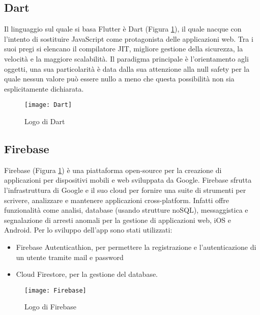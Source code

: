 \subsection{Dart}
Il linguaggio sul quale si basa Flutter è Dart (Figura \ref{fig:dart}), il quale nacque con l’intento di sostituire JavaScript come protagonista delle applicazioni web.\newline
Tra i suoi pregi si elencano il compilatore JIT, migliore gestione della sicurezza, la velocità e la maggiore scalabilità.\newline
Il paradigma principale è l’orientamento agli oggetti, una sua particolarità è data dalla sua attenzione alla null safety per la quale nessun valore può essere nullo a meno che questa possibilità non sia esplicitamente dichiarata.\newline
\begin{figure}[!h] 
    \centering 
    \texttt{[image: Dart]} 
    \caption{Logo di Dart}\label{fig:dart}
\end{figure}

\subsection{Firebase}
Firebase (Figura \ref{fig:dart}) è una piattaforma open-source per la creazione di applicazioni per dispositivi mobili e web sviluppata da Google.\newline
Firebase sfrutta l'infrastruttura di Google e il suo cloud per fornire una suite di strumenti per scrivere, analizzare e mantenere applicazioni cross-platform.\newline
Infatti offre funzionalità come analisi, database (usando strutture noSQL), messaggistica e segnalazione di arresti anomali per la gestione di applicazioni web, iOS e Android.\newline
Per lo sviluppo dell'app sono stati utilizzati:
\begin{itemize}
    \item Firebase Autenticathion, per permettere la registrazione e l'autenticazione di un utente tramite mail e password
    \item Cloud Firestore, per la gestione del database.
\end{itemize}
\begin{figure}[!h] 
    \centering 
    \texttt{[image: Firebase]} 
    \caption{Logo di Firebase}\label{fig:figma}
\end{figure}

